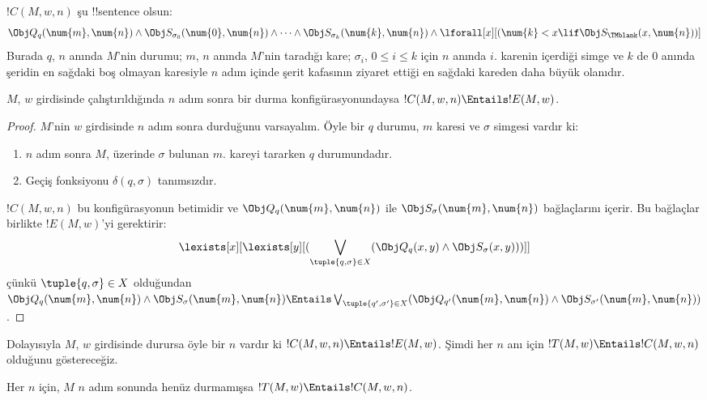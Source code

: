 \documentclass[../../../include/open-logic-section]{subfiles}
\begin{document}
\begin{defn} 
$!C(M,w,n)$ şu !!{sentence} olsun:
\[ 
\Obj Q_q(\num{m}, \num{n}) \land \Obj S_{\sigma_0}(\num{0}, \num{n})
\land \dots \land \Obj S_{\sigma_k}(\num{k}, \num{n}) \land
\lforall[x][(\num{k} < x \lif \Obj S_\TMblank(x, \num{n}))]
\] 
Burada $q$, $n$ anında $M$'nin durumu; $m$, $n$ anında $M$'nin taradığı
kare; $\sigma_i$, $0\le i\le k$ için $n$ anında $i$. karenin içerdiği simge
ve $k$ de $0$ anında şeridin en sağdaki boş olmayan karesiyle $n$ adım içinde
şerit kafasının ziyaret ettiği en sağdaki kareden daha büyük olanıdır.
\end{defn}

\begin{lem}
$M$, $w$ girdisinde çalıştırıldığında $n$ adım sonra bir durma
konfigürasyonundaysa $!C(M,w,n)\Entails !E(M,w)$.
\end{lem}

\begin{proof}
$M$'nin $w$ girdisinde $n$ adım sonra durduğunu varsayalım. Öyle bir $q$
durumu, $m$ karesi ve $\sigma$ simgesi vardır ki:
\begin{enumerate} 
\item $n$ adım sonra $M$, üzerinde $\sigma$ bulunan $m$. kareyi tararken
  $q$ durumundadır.
\item Geçiş fonksiyonu $\delta(q,\sigma)$ tanımsızdır.
\end{enumerate}
$!C(M,w,n)$ bu konfigürasyonun betimidir ve
$\Obj Q_q(\num{m},\num{n})$ ile
$\Obj S_\sigma(\num{m},\num{n})$ bağlaçlarını içerir. Bu bağlaçlar birlikte
$!E(M,w)$'yi gerektirir:
\[
\lexists[x][\lexists[y][(\bigvee_{\tuple{q, \sigma} \in
      X}(\Obj Q_q(x, y) \land \Obj S_\sigma(x, y)))]]
\]
çünkü $\tuple{q,\sigma}\in X$ olduğundan
$\Obj Q_q(\num{m},\num{n})\land\Obj S_\sigma(\num{m},\num{n})
\Entails \bigvee_{\tuple{q',\sigma'}\in X}
(\Obj Q_{q'}(\num{m},\num{n})\land
\Obj S_{\sigma'}(\num{m},\num{n}))$.
\end{proof}

\begin{explain}
Dolayısıyla $M$, $w$ girdisinde durursa öyle bir $n$ vardır ki
$!C(M,w,n)\Entails !E(M,w)$. Şimdi her $n$ anı için
$!T(M,w)\Entails !C(M,w,n)$ olduğunu göstereceğiz.
\end{explain}

\begin{lem}
Her $n$ için, $M$ $n$ adım sonunda henüz durmamışsa
$!T(M,w)\Entails !C(M,w,n)$.
\end{lem}
\end{document}
